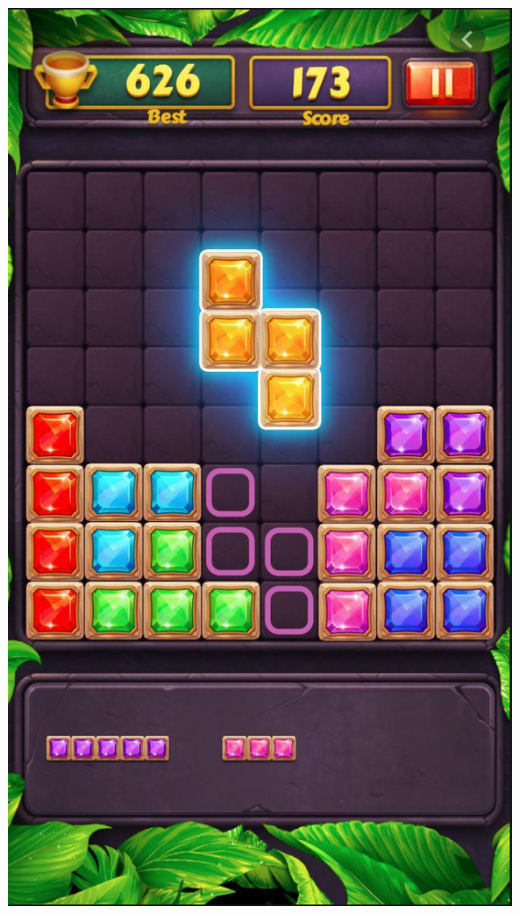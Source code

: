 \documentclass[]{report}
\begin{document}
\includegraphics[scale=0.3]{images/jeuxPublie2.png}
\end{document}
